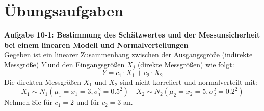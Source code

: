 \newpage
\section{Übungsaufgaben}
\textbf{Aufgabe 10-1: Bestimmung des Schätzwertes und der Messunsicherheit bei
einem linearen Modell und Normalverteilungen}\\
Gegeben ist ein linearer Zusammenhang zwischen der Ausgangsgröße (indirekte
Messgröße) $Y$ und den Eingangsgrößen $X_j$ (direkte Messgrößen) wie folgt:
\[
Y = c_1 \cdot X_1 + c_2 \cdot X_2
\]
Die direkten Messgrößen $X_1$ und $X_2$ sind nicht korreliert und 
normalverteilt mit: 
\[
X_1 \sim N_{1}(\mu_1 =x_1=3,\sigma_1^2= 0.5^2 ) 
\quad X_2 \sim N_{2}(\mu_2=x_2= 5,\sigma_2^2=0.2^2 )
\]
Nehmen Sie für $c_1 = 2$ und für $c_2 = 3$ an. 


